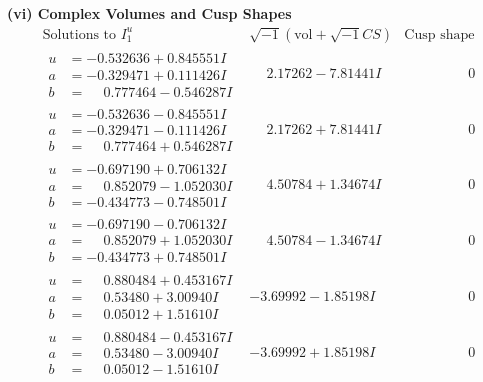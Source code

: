 \documentclass[1p]{elsarticle_modified}
\theoremstyle{definition}
\newcommand{\I}{\sqrt{-1}}
\begin{document}
\newpage\flushleft \textbf{(vi) Complex Volumes and Cusp Shapes}
$$\begin{array}{c|c|c}  
\text{Solutions to }I^u_{1}& \I (\text{vol} + \sqrt{-1}CS) & \text{Cusp shape}\\
 \hline 
\begin{aligned}
u &= -0.532636 + 0.845551 I \\
a &= -0.329471 + 0.111426 I \\
b &= \phantom{-}0.777464 - 0.546287 I\end{aligned}
 & \phantom{-}2.17262 - 7.81441 I & \phantom{-0.000000 } 0 \\ \hline\begin{aligned}
u &= -0.532636 - 0.845551 I \\
a &= -0.329471 - 0.111426 I \\
b &= \phantom{-}0.777464 + 0.546287 I\end{aligned}
 & \phantom{-}2.17262 + 7.81441 I & \phantom{-0.000000 } 0 \\ \hline\begin{aligned}
u &= -0.697190 + 0.706132 I \\
a &= \phantom{-}0.852079 - 1.052030 I \\
b &= -0.434773 - 0.748501 I\end{aligned}
 & \phantom{-}4.50784 + 1.34674 I & \phantom{-0.000000 } 0 \\ \hline\begin{aligned}
u &= -0.697190 - 0.706132 I \\
a &= \phantom{-}0.852079 + 1.052030 I \\
b &= -0.434773 + 0.748501 I\end{aligned}
 & \phantom{-}4.50784 - 1.34674 I & \phantom{-0.000000 } 0 \\ \hline\begin{aligned}
u &= \phantom{-}0.880484 + 0.453167 I \\
a &= \phantom{-}0.53480 + 3.00940 I \\
b &= \phantom{-}0.05012 + 1.51610 I\end{aligned}
 & -3.69992 - 1.85198 I & \phantom{-0.000000 } 0 \\ \hline\begin{aligned}
u &= \phantom{-}0.880484 - 0.453167 I \\
a &= \phantom{-}0.53480 - 3.00940 I \\
b &= \phantom{-}0.05012 - 1.51610 I\end{aligned}
 & -3.69992 + 1.85198 I & \phantom{-0.000000 } 0 \\ \hline\begin{aligned}

\end{aligned}
\end{array}$$
\end{document}
